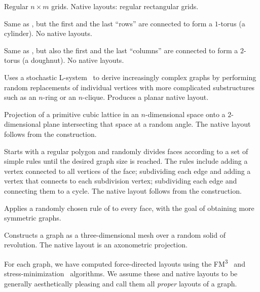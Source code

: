 \begin{explanation}
 Regular $n\times{}m$ grids.  Native layouts: regular rectangular grids.

 Same as , but the first and the last \enquote{rows} are connected to form a $1$-torus
(a cylinder).  No native layouts.

 Same as , but also the first and the last \enquote{columns} are connected to form a
$2$-torus (a doughnut).  No native layouts.

 Uses a stochastic L-system~\cite{Lindenmayer1990} to derive increasingly complex graphs by
performing random replacements of individual vertices with more complicated substructures such as an $n$-ring or an
$n$-clique.   Produces a planar native layout.

 Projection of a primitive cubic lattice in an
$n$-di\-men\-sio\-nal space onto a $2$-dimensional plane intersecting that space at a random angle.  The native layout
follows from the construction.

 Starts with a regular polygon and randomly divides faces according to a set of simple rules
until the desired graph size is reached.  The rules include adding a vertex connected to all vertices of the face;
subdividing each edge and adding a vertex that connects to each subdivision vertex; subdividing each edge and connecting
them to a cycle.   The
native layout follows from the construction.

 Applies a randomly chosen rule of  to every face, with the goal of obtaining more
symmetric graphs.

 Constructs a graph as a three-dimensional mesh over a random solid of revolution.  The native
layout is an axonometric projection.
\end{explanation}

\noindent
For each graph, we have computed force-directed layouts using the FM\textsuperscript{3}~\cite{Hachul2005} and
stress-minimization~\cite{Kamada1989} algorithms.  We assume these and native layouts to be generally aesthetically
pleasing and call them all \emph{proper} layouts of a graph.

